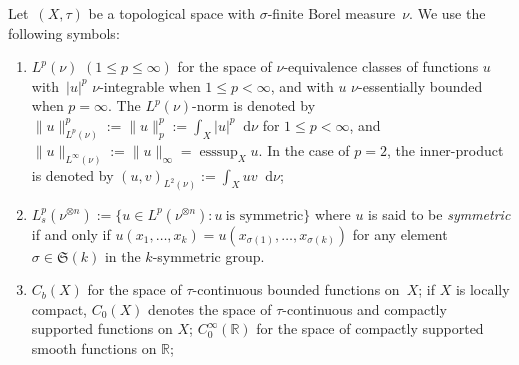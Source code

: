 \documentclass[11pt,letterpaper]{amsart}
\newcommand{\T}{\tau} %
\newcommand{\A}{\Sigma} %
\renewcommand{\complement}{\mathrm{c}}
\newcommand{\Sb}{\A_b}
\DeclareMathOperator{\eqdef}{\coloneqq}
\newcommand{\longrar}{\longrightarrow}
\newcommand{\diff}{\mathop{}\!\mathrm{d}}
\newcommand{\set}[1]{\left\{#1\right\}}							%
\newcommand{\paren}[1]{\left(#1\right)}							%
\newcommand{\class}[2][]{\left[#2\right]_{#1}}						%
\newcommand{\seq}[1]{\paren{#1}}								%
\newcommand{\tseq}[1]{{\big(#1\big)}}
\newcommand{\Cb}{\mcC_b}									%
\newcommand{\Cz}{\mcC_0}									%
\DeclareMathOperator*{\esssup}{esssup}
\newcommand{\R}{{\mathbb R}}
\newcommand{\comma}{\,\,\mathrm{,}\;\,}
\newcommand{\fstop}{\,\,\mathrm{.}}
\renewcommand{\1}{\mathbf 1}
\renewcommand{\msE}{\mathscr K}
\numberwithin{equation}{section}
\theoremstyle{plain}
\theoremstyle{definition}
\theoremstyle{remark}
\begin{document}
Let~$(X, \tau)$ be a topological space with $\sigma$-finite Borel measure~$\nu$. We use the following symbols:
\begin{enumerate}[$(a)$]
\item $L^p(\nu)$ $(1 \le p \le \infty)$ for the space of $\nu$-equivalence classes of functions $u$ with~$|u|^p$ $\nu$-integrable when $1 \le p<\infty$, and with $u$ $\nu$-essentially bounded when $p=\infty$. The $L^p(\nu)$-norm is denoted by $\|u\|^p_{L^p(\nu)}:=\|u\|^p_p:=\int_X |u|^p \diff \nu$ for $1 \le p <\infty$, and $\|u\|_{L^\infty(\nu)}:=\|u\|_\infty=\esssup_X u$.  In the case of $p=2$, the inner-product is denoted by $(u, v)_{L^2(\nu)}:=\int_X uv \diff \nu$; 
\item  $L^p_s(\nu^{\otimes n}):=\{u \in L^p(\nu^{\otimes n}): u\ \text{is symmetric}\}$ where $u$ is said to be {\it symmetric} if and only if $u(x_1, \ldots, x_k)=u(x_{\sigma(1)}, \ldots, x_{\sigma(k)})$ for any element $\sigma \in \mathfrak S(k)$ in the $k$-symmetric group.
%
\item $C_b(X)$ for the space of $\T$-continuous bounded functions on~$X$; if $X$ is locally compact, $C_0(X)$ denotes the space of $\tau$-continuous and compactly supported  functions on $X$; $C_0^\infty(\R)$ for the space of compactly supported smooth functions on $\R$;

\end{enumerate}
\end{document}
